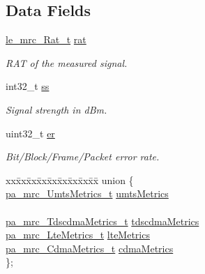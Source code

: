 \subsection*{Data Fields}
\begin{DoxyCompactItemize}
\item 
\hyperlink{le__mrc__interface_8h_aaf23906c37ad59fb96a8a48f7fab5b43}{le\+\_\+mrc\+\_\+\+Rat\+\_\+t} \hyperlink{structpa__mrc___signal_metrics__t_a3b125b4ee9ce783b5fea1f9ff41e8183}{rat}
\begin{DoxyCompactList}\small\item\em R\+AT of the measured signal. \end{DoxyCompactList}\item 
int32\+\_\+t \hyperlink{structpa__mrc___signal_metrics__t_aece719e71df67b28a251c04fb4f8b2ff}{ss}
\begin{DoxyCompactList}\small\item\em Signal strength in d\+Bm. \end{DoxyCompactList}\item 
uint32\+\_\+t \hyperlink{structpa__mrc___signal_metrics__t_a5bf6e783e4aa649a3aa66f26d716974a}{er}
\begin{DoxyCompactList}\small\item\em Bit/\+Block/\+Frame/\+Packet error rate. \end{DoxyCompactList}\item 
\begin{tabbing}
xx\=xx\=xx\=xx\=xx\=xx\=xx\=xx\=xx\=\kill
union \{\\
\>\hyperlink{structpa__mrc___umts_metrics__t}{pa\_mrc\_UmtsMetrics\_t} \hyperlink{structpa__mrc___signal_metrics__t_a6941106d20ccefcbb170adfe596ef3a7}{umtsMetrics}\\
\>\\
\>\hyperlink{structpa__mrc___tdscdma_metrics__t}{pa\_mrc\_TdscdmaMetrics\_t} \hyperlink{structpa__mrc___signal_metrics__t_af9f3e10354b76efcb6985044ff4e1bcd}{tdscdmaMetrics}\\
\>\hyperlink{structpa__mrc___lte_metrics__t}{pa\_mrc\_LteMetrics\_t} \hyperlink{structpa__mrc___signal_metrics__t_ac827f039013ba54d3c84b616bc59044c}{lteMetrics}\\
\>\hyperlink{structpa__mrc___cdma_metrics__t}{pa\_mrc\_CdmaMetrics\_t} \hyperlink{structpa__mrc___signal_metrics__t_a4e7f9b94f373e1e62876765e242f73db}{cdmaMetrics}\\
\}; \\

\end{tabbing}\end{DoxyCompactItemize}


